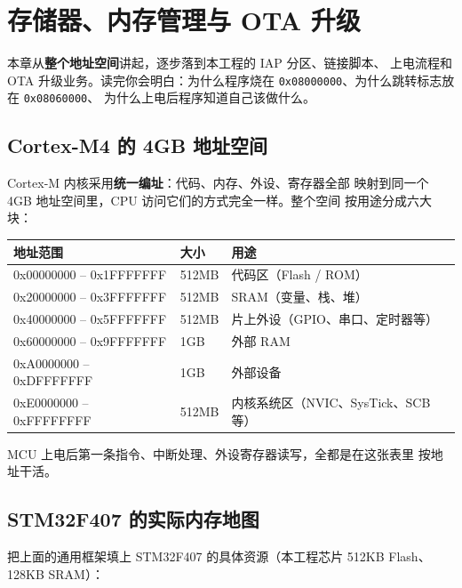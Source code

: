 \section{存储器、内存管理与 OTA 升级}

本章从\textbf{整个地址空间}讲起，逐步落到本工程的 IAP 分区、链接脚本、
上电流程和 OTA 升级业务。读完你会明白：为什么程序烧在
\texttt{0x08000000}、为什么跳转标志放在 \texttt{0x08060000}、
为什么上电后程序知道自己该做什么。

\subsection{Cortex-M4 的 4GB 地址空间}

Cortex-M 内核采用\textbf{统一编址}：代码、内存、外设、寄存器全部
映射到同一个 4GB 地址空间里，CPU 访问它们的方式完全一样。整个空间
按用途分成六大块：

\begin{tabular}{lll}
\toprule
\textbf{地址范围} & \textbf{大小} & \textbf{用途} \\
\midrule
0x00000000 -- 0x1FFFFFFF & 512MB & 代码区（Flash / ROM） \\
0x20000000 -- 0x3FFFFFFF & 512MB & SRAM（变量、栈、堆） \\
0x40000000 -- 0x5FFFFFFF & 512MB & 片上外设（GPIO、串口、定时器等） \\
0x60000000 -- 0x9FFFFFFF & 1GB & 外部 RAM \\
0xA0000000 -- 0xDFFFFFFF & 1GB & 外部设备 \\
0xE0000000 -- 0xFFFFFFFF & 512MB & 内核系统区（NVIC、SysTick、SCB 等） \\
\bottomrule
\end{tabular}

MCU 上电后第一条指令、中断处理、外设寄存器读写，全都是在这张表里
按地址干活。

\subsection{STM32F407 的实际内存地图}

把上面的通用框架填上 STM32F407 的具体资源（本工程芯片 512KB Flash、
128KB SRAM）：

